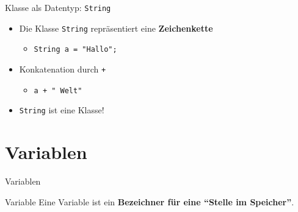 \documentclass[18pt]{beamer}
\newcommand{\quotes}[1]{``#1''}
\begin{document}
\begin{frame}{Klasse als Datentyp: \texttt{String}}
    \begin{itemize}
        \item Die Klasse \texttt{String} repräsentiert eine \textbf{Zeichenkette}
        \begin{itemize}
            \item \texttt{String a = "Hallo";}
        \end{itemize}
        \pause
        \item Konkatenation durch \texttt{+}
        \begin{itemize}
            \item \texttt{a + " Welt"}
        \end{itemize}
        \pause
        \item \texttt{String} ist eine Klasse!
    \end{itemize}
\end{frame}


\section{Variablen}

\begin{frame}{Variablen}
    \begin{block}{Variable}
        Eine Variable ist ein \textbf{Bezeichner für eine \quotes{Stelle im Speicher}}.
    \end{block}
\end{frame}
\end{document}
